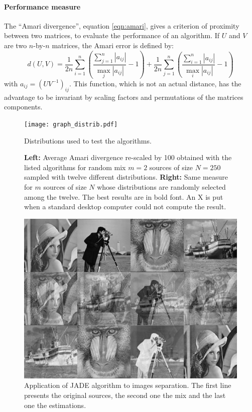 \documentclass[a4paper]{article}
\begin{document}
\paragraph{Performance measure}
The ``Amari divergence'', equation \ref{eqn:amari}, gives a criterion of proximity between two matrices, to evaluate the performance of an algorithm.
If $U$ and $V$ are two $n$-by-$n$ matrices, the Amari error is defined by:
\begin{equation} \label{eqn:amari}
	d(U,V) = \frac{1}{2n}\sum\limits_{i=1}^n \left(\frac{\sum\limits_{j=1}^n|a_{ij}|}{\max_j |a_{ij}|}-1 \right)+\frac{1}{2n}\sum\limits_{j=1}^n \left(\frac{\sum\limits_{i=1}^n|a_{ij}|}{\max_i |a_{ij}|}-1 \right)
\end{equation}
with $a_{ij} = (UV^{-1})_{ij}$.
This function, which is not an actual distance, has the advantage to be invariant by scaling factors and permutations of the matrices components.

\begin{figure}
\label{distrib}
\centering
\texttt{[image: graph\_distrib.pdf]}\\
\caption{Distributions used to test the algorithms.}
\end{figure}

\begin{figure}
\label{distres}
\centering

\vspace{3mm}
\caption{\textbf{Left:} Average Amari divergence re-scaled by 100 obtained with the listed algorithms for random mix $m=2$ sources of size $N=250$ sampled with twelve different distributions. \textbf{Right:} Same measure for $m$ sources of size $N$ whose distributions are randomly selected among the twelve. The best results are in bold font. An X is put when a standard desktop computer could not compute the result.}
\end{figure}

\begin{figure}
\label{imres}
\centering
\includegraphics[width=.74\textwidth]{../image_test/unmix4.png}
\caption{Application of JADE algorithm to images separation. The first line presents the original sources, the second one the mix and the last one the estimations.}
\end{figure}
\end{document}
